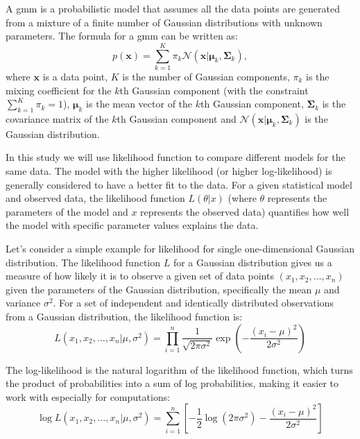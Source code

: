 A \gls{gmm} is a probabilistic model that assumes all the data points are generated from a mixture of a finite number of Gaussian distributions with unknown parameters. The formula for a \acrshort{gmm} can be written as:
\begin{equation}
    p(\mathbf{x}) = \sum_{k=1}^K \pi_k \mathcal{N}(\mathbf{x} | \boldsymbol{\mu}_k, \boldsymbol{\Sigma}_k) {,}
    \label{eq:gmm}
\end{equation}
where \( \mathbf{x} \) is a data point, \( K \) is the number of Gaussian components, \( \pi_k \) is the mixing coefficient for the \(k\)th Gaussian component (with the constraint \( \sum_{k=1}^K \pi_k = 1 \)), \( \boldsymbol{\mu}_k \) is the mean vector of the \(k\)th Gaussian component, \( \boldsymbol{\Sigma}_k \) is the covariance matrix of the \(k\)th Gaussian component and 
\( \mathcal{N}(\mathbf{x} | \boldsymbol{\mu}_k, \boldsymbol{\Sigma}_k) \) is the Gaussian distribution.


In this study we will use likelihood function to compare different models for the same data. The model with the higher likelihood (or higher log-likelihood) is generally considered to have a better fit to the data.
For a given statistical model and observed data, the likelihood function $L(\theta|x)$ (where $\theta$ represents the parameters of the model and $x$ represents the observed data) quantifies how well the model with specific parameter values explains the data.

Let's consider a simple example for likelihood for single one-dimensional Gaussian distribution.
The likelihood function $L$ for a Gaussian distribution gives us a measure of how likely it is to observe a given set of data points $(x_1, x_2, \ldots, x_n)$ given the parameters of the Gaussian distribution, specifically the mean $\mu$ and variance $\sigma^2$.
For a set of independent and identically distributed observations from a Gaussian distribution, the likelihood function is:
\begin{equation}
    L(x_1, x_2, \ldots, x_n | \mu, \sigma^2) = \prod_{i=1}^{n} \frac{1}{\sqrt{2\pi\sigma^2}} \exp\left(-\frac{(x_i - \mu)^2}{2\sigma^2}\right)
\end{equation}

The log-likelihood is the natural logarithm of the likelihood function, which turns the product of probabilities into a sum of log probabilities, making it easier to work with especially for computations:
\begin{equation}
    \log L(x_1, x_2, \ldots, x_n | \mu, \sigma^2) = \sum_{i=1}^{n} \left[ -\frac{1}{2}\log(2\pi\sigma^2) -\frac{(x_i - \mu)^2}{2\sigma^2} \right]
\end{equation}


